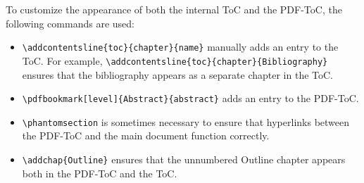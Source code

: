 To customize the appearance of both the internal ToC and the PDF-ToC, the following commands are used:
\begin{itemize}
	\item \verb|\addcontentsline{toc}{chapter}{name}|  manually adds an entry to the ToC.  For example, \verb|\addcontentsline{toc}{chapter}{Bibliography}| ensures that the bibliography appears as a separate chapter in the ToC.
	\item \verb|\pdfbookmark[level]{Abstract}{abstract}| adds an entry to the PDF-ToC.
	\item \verb|\phantomsection| is sometimes necessary to ensure that hyperlinks between the PDF-ToC and the main document function correctly.
	\item \verb|\addchap{Outline}| ensures that the unnumbered Outline chapter appears both in the PDF-ToC and the ToC.
\end{itemize} 


